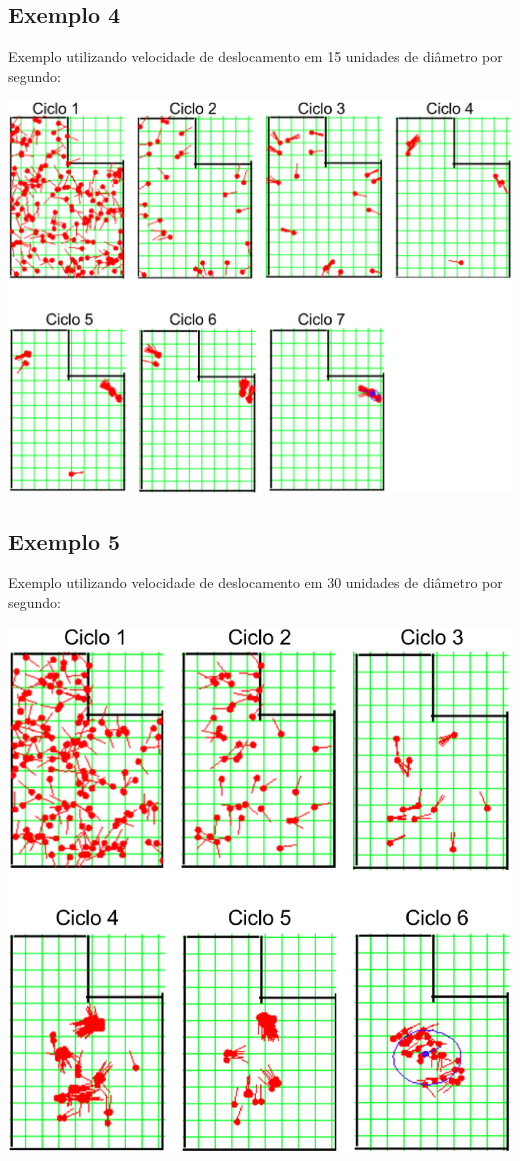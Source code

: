 \subsection{Exemplo 4}

Exemplo utilizando velocidade de deslocamento em 15 unidades de diâmetro por segundo:

{\centering
\includegraphics[scale=0.4]{figuras/cen3_ex4.eps}
\label{img:cen3_ex4}
\par}

\subsection{Exemplo 5}

Exemplo utilizando velocidade de deslocamento em 30 unidades de diâmetro por segundo:

{\centering
\includegraphics[scale=0.4]{figuras/cen3_ex5.eps}
\label{img:cen3_ex5}
\par}
